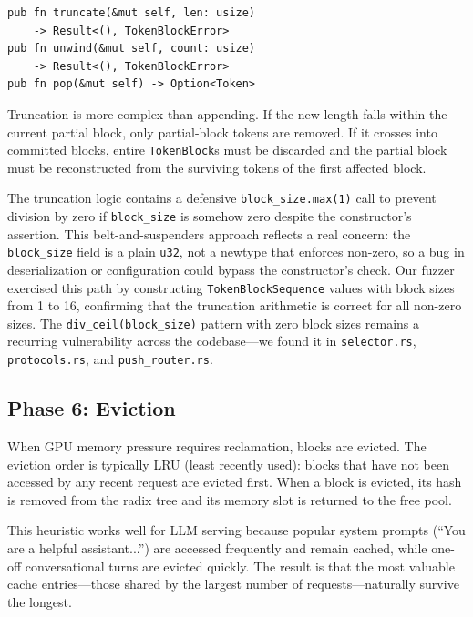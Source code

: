 \begin{verbatim}
pub fn truncate(&mut self, len: usize)
    -> Result<(), TokenBlockError>
pub fn unwind(&mut self, count: usize)
    -> Result<(), TokenBlockError>
pub fn pop(&mut self) -> Option<Token>
\end{verbatim}

Truncation is more complex than appending. If the new length falls within the current partial block, only partial-block tokens are removed. If it crosses into committed blocks, entire \texttt{TokenBlock}s must be discarded and the partial block must be reconstructed from the surviving tokens of the first affected block.

\begin{bugbox}
The truncation logic contains a defensive \texttt{block\_size.max(1)} call to prevent division by zero if \texttt{block\_size} is somehow zero despite the constructor's assertion. This belt-and-suspenders approach reflects a real concern: the \texttt{block\_size} field is a plain \texttt{u32}, not a newtype that enforces non-zero, so a bug in deserialization or configuration could bypass the constructor's check. Our fuzzer exercised this path by constructing \texttt{TokenBlockSequence} values with block sizes from 1 to 16, confirming that the truncation arithmetic is correct for all non-zero sizes. The \texttt{div\_ceil(block\_size)} pattern with zero block sizes remains a recurring vulnerability across the codebase---we found it in \texttt{selector.rs}, \texttt{protocols.rs}, and \texttt{push\_router.rs}.
\end{bugbox}

\subsection{Phase 6: Eviction}

When GPU memory pressure requires reclamation, blocks are evicted. The eviction order is typically LRU (least recently used): blocks that have not been accessed by any recent request are evicted first. When a block is evicted, its hash is removed from the radix tree and its memory slot is returned to the free pool.

This heuristic works well for LLM serving because popular system prompts (``You are a helpful assistant...'') are accessed frequently and remain cached, while one-off conversational turns are evicted quickly. The result is that the most valuable cache entries---those shared by the largest number of requests---naturally survive the longest.

